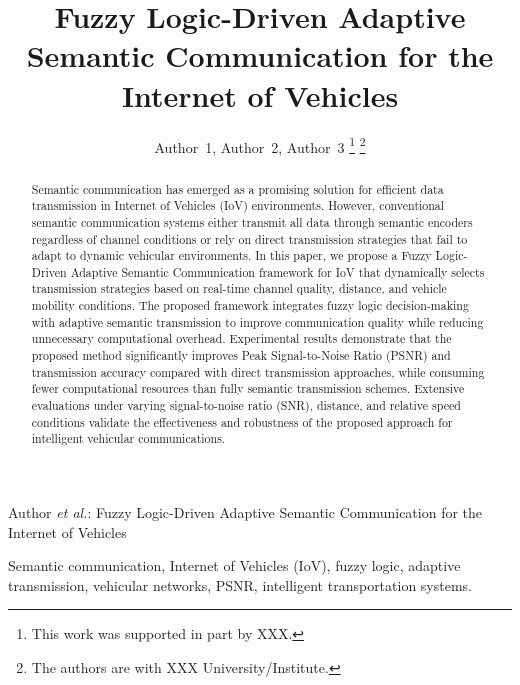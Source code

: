 \documentclass[lettersize,journal]{IEEEtran}
\begin{document}
\title{Fuzzy Logic-Driven Adaptive Semantic Communication for the Internet of Vehicles}

\author{
Author~1,
Author~2,
Author~3
\thanks{
This work was supported in part by XXX.
}
\thanks{
The authors are with XXX University/Institute.
}
}

%
{Author \MakeLowercase{\textit{et al.}}: Fuzzy Logic-Driven Adaptive Semantic Communication for the Internet of Vehicles}


\maketitle

\begin{abstract}

Semantic communication has emerged as a promising solution for efficient data transmission in Internet of Vehicles (IoV) environments. However, conventional semantic communication systems either transmit all data through semantic encoders regardless of channel conditions or rely on direct transmission strategies that fail to adapt to dynamic vehicular environments. In this paper, we propose a Fuzzy Logic-Driven Adaptive Semantic Communication framework for IoV that dynamically selects transmission strategies based on real-time channel quality, distance, and vehicle mobility conditions. The proposed framework integrates fuzzy logic decision-making with adaptive semantic transmission to improve communication quality while reducing unnecessary computational overhead. Experimental results demonstrate that the proposed method significantly improves Peak Signal-to-Noise Ratio (PSNR) and transmission accuracy compared with direct transmission approaches, while consuming fewer computational resources than fully semantic transmission schemes. Extensive evaluations under varying signal-to-noise ratio (SNR), distance, and relative speed conditions validate the effectiveness and robustness of the proposed approach for intelligent vehicular communications.

\end{abstract}

\begin{IEEEkeywords}

Semantic communication, Internet of Vehicles (IoV), fuzzy logic, adaptive transmission, vehicular networks, PSNR, intelligent transportation systems.

\end{IEEEkeywords}
\end{document}
